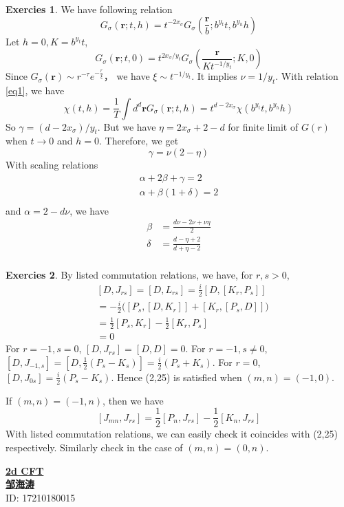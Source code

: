 \documentclass[11pt,a4paper]{article}
\theoremstyle{definition}
\newtheorem{exer}{Exercies}[subsection]
\begin{document}
\begin{exer}
	We have following relation
	\begin{equation}\label{eq1}
	G_{\sigma}(\mathbf{r};t,h) = t^{-2x_{\sigma}}G_\sigma (\frac{\mathbf{r}}{b};b^{y_t}t,b^{y_h}h)
	\end{equation}
	Let $h=0, K= b^{y_t}t$,	
	\[
	G_{\sigma}(\mathbf{r};t,0) = t^{2x_{\sigma}/y_{t}}G_\sigma (\frac{\mathbf{r}}{K t^{-1/y_{t}}};K,0)
	\]
	Since $ G_{\sigma}(\mathbf{r}) \sim r^{-\tau} e^{-\frac{r}{\xi}}$， we have $\xi \sim t^{-1/y_t}$. It implies $\nu = 1/y_t$. With relation \ref{eq1}, we have 
	\[
	\chi(t,h)= \frac{1}{T} \int d^d \mathbf{r} G_\sigma (\mathbf{r};t,h)= t^{d-2x_\sigma} \chi (b^{y_t}t, b^{y_h}h)
	\]
	So $\gamma = (d-2x_\sigma)/y_t$. But we have $\eta = 2 x_\sigma +2 -d$ for finite limit of $G(r)$ when $t \to 0$ and $h=0$. Therefore, we get
	\[
	\gamma = \nu(2-\eta)
	\]With scaling relations
	\[
	\begin{aligned}
	\alpha + 2 \beta + \gamma =2\\
	\alpha + \beta (1+\delta) =2\\
	\end{aligned}
	\]
	and $\alpha = 2 -d \nu$, we have
	\[
	\begin{aligned}
	\beta &= \frac{d\nu -2\nu + \nu \eta}{2}\\
	\delta &= \frac{d-\eta +2}{d+\eta -2}\\
	\end{aligned}
	\]
	\end{exer}
\begin{exer}
	By listed commutation relations, we have, for $r, s > 0$,
	\[
	\begin{aligned}
	&[D, J_{rs}]= [D, L_{rs}] = \frac{i}{2} [D, [K_r, P_s]]\\
	 & =-\frac{i}{2}\big([P_s,[D,K_r]]+ [K_r,[P_s,D]]\big)\\
	 & =\frac{1}{2}[P_s, K_r] -\frac{1}{2}[K_r, P_s]\\
	 &=0
	\end{aligned}
	\]
	For $r=-1,s=0$, $[D,J_{rs}]= [D,D]=0$. For $r=-1, s\neq 0$, $[D,J_{-1,s}]=[D,\frac{1}{2}(P_s - K_s)]= \frac{i}{2}(P_s +K_s)$. For $r=0$, $[D, J_{0s}] = \frac{i}{2}(P_s - K_s)$. Hence (2,25) is satisfied when $(m,n)=(-1,0)$.
	
	If $(m,n)=(-1,n)$, then we have 
	\[
	[J_{mn},J_{rs}] = \frac{1}{2}[P_n, J_{rs}] -\frac{1	}{2} [K_n, J_{rs}]
	\]
	With listed commutation relations, we can easily check it coincides with (2,25) respectively. Similarly check in the case of $(m,n)= (0,n)$. 
\end{exer}
\newpage
\noindent
{\LARGE\underline{\textbf{2d CFT}}}\\
{\hfill\large  \underline{\textbf{邹海涛}} \\
	\hfill ID: 17210180015}\\
\end{document}
